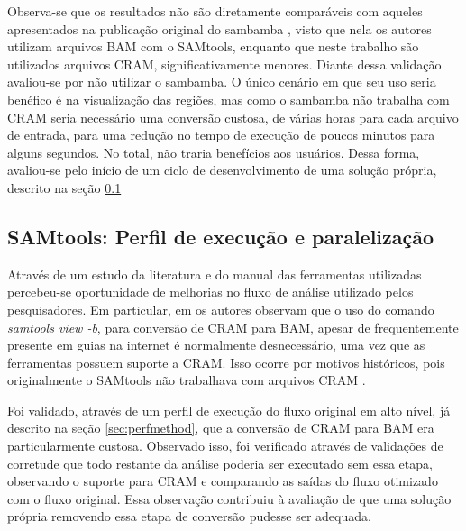 \documentclass[cic,tc]{iiufrgs}
\begin{document}
Observa-se que os resultados não são diretamente comparáveis com aqueles
apresentados na publicação original do sambamba \cite{tarasov2015sambamba},
visto que nela os autores utilizam arquivos BAM com o SAMtools, enquanto que
neste trabalho são utilizados arquivos CRAM, significativamente menores. Diante
dessa validação avaliou-se por não utilizar o sambamba. O único cenário em que
seu uso seria benéfico é na visualização das regiões, mas como o sambamba não
trabalha com CRAM seria necessário uma conversão custosa, de várias horas para
cada arquivo de entrada, para uma redução no tempo de execução de poucos
minutos para alguns segundos.  No total, não traria benefícios aos usuários.
Dessa forma, avaliou-se pelo início de um ciclo de desenvolvimento de uma
solução própria, descrito na seção \ref{sec:parsamtools}

\subsection{SAMtools: Perfil de execução e paralelização}
\label{sec:parsamtools}

Através de um estudo da literatura e do manual das ferramentas utilizadas
percebeu-se oportunidade de melhorias no fluxo de análise utilizado pelos
pesquisadores. Em particular, em \cite{danecek2021twelve} os autores observam
que o uso do comando \textit{samtools view -b}, para conversão de CRAM para
BAM, apesar de frequentemente presente em guias na internet é normalmente
desnecessário, uma vez que as ferramentas possuem suporte a CRAM. Isso ocorre
por motivos históricos, pois originalmente o SAMtools não trabalhava com
arquivos CRAM \cite{danecek2021twelve}.

Foi validado, através de um perfil de execução do fluxo original em alto nível,
já descrito na seção \ref{sec:perfmethod}, que a conversão de CRAM para BAM era
particularmente custosa. Observado isso, foi verificado através de validações
de corretude que todo restante da análise poderia ser executado sem essa etapa,
observando o suporte para CRAM e comparando as saídas do fluxo otimizado com o
fluxo original. Essa observação contribuiu à avaliação de que uma solução própria
removendo essa etapa de conversão pudesse ser adequada.
\end{document}
